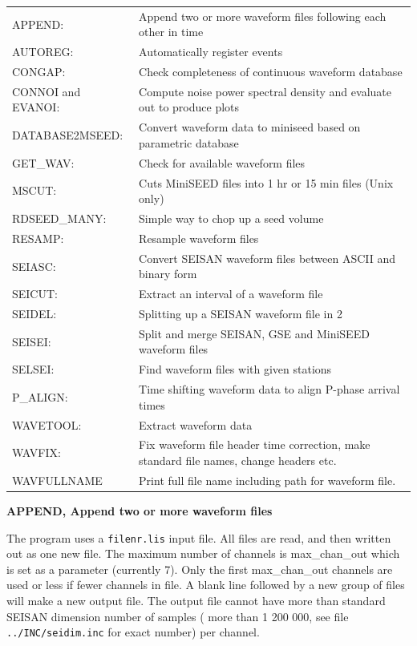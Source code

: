 \begin{tabular}{lp{8cm}}
APPEND: & Append two or more waveform files following each other in time \\
AUTOREG: & Automatically register events \\
CONGAP: & Check completeness of continuous waveform database \\
CONNOI and EVANOI: & Compute noise power spectral density and evaluate out to produce plots \\
DATABASE2MSEED: & Convert waveform data to miniseed based on parametric database\\
GET\_WAV: & Check for available waveform files \\
MSCUT: & Cuts MiniSEED files into 1 hr or 15 min files (Unix only) \\
RDSEED\_MANY: & Simple way to chop up a seed volume \\
RESAMP: & Resample  waveform files \\
SEIASC: & Convert SEISAN waveform files between ASCII and binary form \\
SEICUT: & Extract an interval of a  waveform file \\
SEIDEL: & Splitting up a SEISAN waveform file in 2 \\
SEISEI: & Split and merge SEISAN, GSE and MiniSEED waveform files \\
SELSEI: & Find waveform files with given stations \\
P\_ALIGN: & Time shifting waveform data to align P-phase arrival times \\
WAVETOOL: & Extract waveform data \\
WAVFIX: & Fix waveform file header time correction, make standard file \index{WAVFIX}names, 
  change headers etc. \\
WAVFULLNAME & Print full file name including path for waveform file.\\
\end{tabular}

\textbf{APPEND, Append two or more waveform files}

The program uses a \texttt{filenr.lis} input file. All files are read, and then written out as one new file. The maximum number of channels is max\_chan\_out which is set as a parameter (currently 7). Only the first max\_chan\_out channels are used or less if fewer channels in file. A blank line followed by a new group of files will make a new output file. The output file cannot have more than standard SEISAN dimension number of samples ( more than 1 200 000, see file \texttt{../INC/seidim.inc} for exact number) per channel. 

